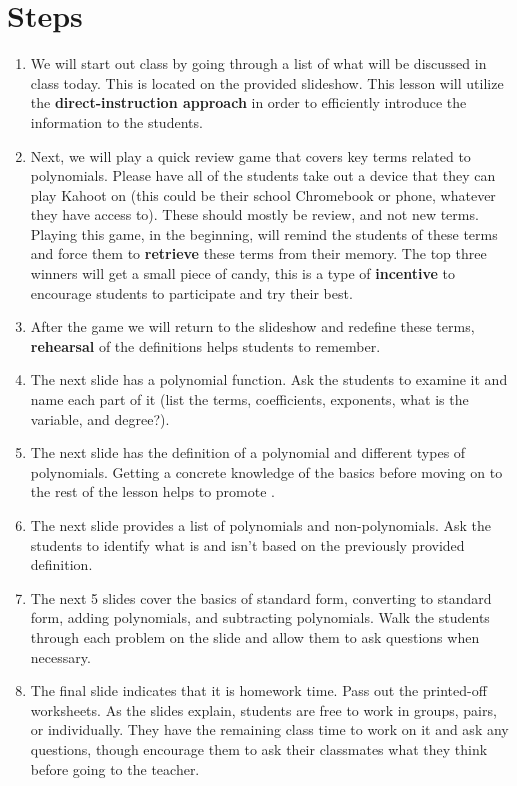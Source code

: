 \section{Steps}

\begin{enumerate}
    \item We will start out class by going through a list of what will be discussed in class today. This is located on the provided slideshow. This lesson will utilize the \textbf{direct-instruction approach} in order to efficiently introduce the information to the students.
    \newpage

    \item Next, we will play a quick review game that covers key terms related to polynomials. Please have all of the students take out a device that they can play Kahoot on (this could be their school Chromebook or phone, whatever they have access to). These should mostly be review, and not new terms. Playing this game, in the beginning, will remind the students of these terms and force them to \textbf{retrieve} these terms from their memory. The top three winners will get a small piece of candy, this is a type of \textbf{incentive} to encourage students to participate and try their best.
    \item After the game we will return to the slideshow and redefine these terms, \textbf{rehearsal} of the definitions helps students to remember. 
    \item The next slide has a polynomial function. Ask the students to examine it and name each part of it (list the terms, coefficients, exponents, what is the variable, and degree?).
    \item The next slide has the definition of a polynomial and different types of polynomials. Getting a concrete knowledge of the basics before moving on to the rest of the lesson helps to promote .
    \item The next slide provides a list of polynomials and non-polynomials. Ask the students to identify what is and isn't based on the previously provided definition.
    \item The next 5 slides cover the basics of standard form, converting to standard form, adding polynomials, and subtracting polynomials. Walk the students through each problem on the slide and allow them to ask questions when necessary.
    \item The final slide indicates that it is homework time. Pass out the printed-off worksheets. As the slides explain, students are free to work in groups, pairs, or individually. They have the remaining class time to work on it and ask any questions, though encourage them to ask their classmates what they think before going to the teacher.
\end{enumerate}